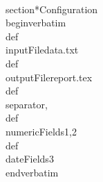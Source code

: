 \\section*{Configuration}
\\begin{verbatim}
% Configuration for TeX Data Processing Utility
% Define input data format and processing rules.
\\def\\inputFile{data.txt}
\\def\\outputFile{report.tex}
\\def\\separator{,}
\\def\\numericFields{1,2}
\\def\\dateFields{3}
\\end{verbatim}
